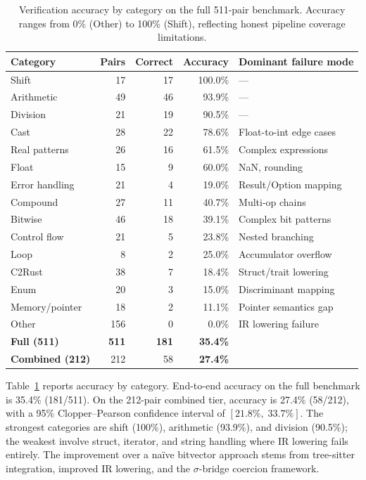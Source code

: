\documentclass[10pt,a4paper]{article}
\begin{document}
\begin{table}[t]
\centering
\small
\caption{Verification accuracy by category on the full 511-pair
benchmark.  Accuracy ranges from 0\% (Other) to 100\% (Shift),
reflecting honest pipeline coverage limitations.}
\label{tab:accuracy}
\begin{tabular}{@{}lrrrl@{}}
\toprule
Category & Pairs & Correct & Accuracy & Dominant failure mode \\
\midrule
Shift            & 17  & 17  & 100.0\% & --- \\
Arithmetic       & 49  & 46  & 93.9\% & --- \\
Division         & 21  & 19  & 90.5\% & --- \\
Cast             & 28  & 22  & 78.6\% & Float-to-int edge cases \\
Real patterns    & 26  & 16  & 61.5\% & Complex expressions \\
Float            & 15  & 9   & 60.0\% & NaN, rounding \\
Error handling   & 21  & 4   & 19.0\% & Result/Option mapping \\
Compound         & 27  & 11  & 40.7\% & Multi-op chains \\
Bitwise          & 46  & 18  & 39.1\% & Complex bit patterns \\
Control flow     & 21  & 5   & 23.8\% & Nested branching \\
Loop             & 8   & 2   & 25.0\% & Accumulator overflow \\
C2Rust           & 38  & 7   & 18.4\% & Struct/trait lowering \\
Enum             & 20  & 3   & 15.0\% & Discriminant mapping \\
Memory/pointer   & 18  & 2   & 11.1\% & Pointer semantics gap \\
Other            & 156 & 0   & 0.0\%  & IR lowering failure \\
\midrule
\textbf{Full (511)} & \textbf{511} & \textbf{181} &
  \textbf{35.4\%} & \\
\textbf{Combined (212)} & 212 & 58 & \textbf{27.4\%} & \\
\bottomrule
\end{tabular}
\end{table}

Table~\ref{tab:accuracy} reports accuracy by category.  End-to-end
accuracy on the full benchmark is 35.4\% (181/511).
On the 212-pair combined tier, accuracy is 27.4\% (58/212),
with a 95\% Clopper--Pearson confidence interval of
$[21.8\%,\; 33.7\%]$.
The strongest categories are shift (100\%), arithmetic (93.9\%),
and division (90.5\%); the weakest involve struct, iterator, and
string handling where IR lowering fails entirely.  The improvement
over a na\"ive bitvector approach stems from tree-sitter
integration, improved IR lowering, and the $\sigma$-bridge coercion
framework.
\end{document}
